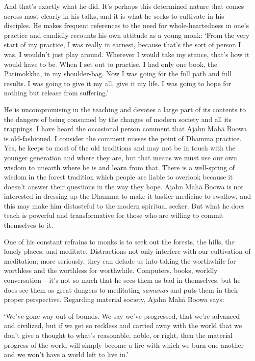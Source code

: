 And that's exactly what he did. It's perhaps this determined nature that
comes across most clearly in his talks, and it is what he seeks to
cultivate in his disciples. He makes frequent references to the need for
whole-heartedness in one's practice and candidly recounts his own
attitude as a young monk: `From the very start of my practice, I was
really in earnest, because that's the sort of person I was. I wouldn't
just play around. Wherever I would take my stance, that's how it would
have to be. When I set out to practise, I had only one book, the
Pātimokkha, in my shoulder-bag. Now I was going for the full path and
full results. I was going to give it my all, give it my life. I was
going to hope for nothing but release from suffering.'

He is uncompromising in the teaching and devotes a large part of its
contents to the dangers of being consumed by the changes of modern
society and all its trappings. I have heard the occasional person
comment that Ajahn Mahā Boowa is old-fashioned. I consider the comment
misses the point of Dhamma practice. Yes, he keeps to most of the old
traditions and may not be in touch with the younger generation and where
they are, but that means we must use our own wisdom to unearth where he
is and learn from that. There is a well-spring of wisdom in the forest
tradition which people are liable to overlook because it doesn't answer
their questions in the way they hope. Ajahn Mahā Boowa is not interested
in dressing up the Dhamma to make it tastier medicine to swallow, and
this may make him distasteful to the modern spiritual seeker. But what
he does teach is powerful and transformative for those who are willing
to commit themselves to it.

One of his constant refrains to monks is to seek out the forests, the
hills, the lonely places, and meditate. Distractions not only interfere
with our cultivation of meditation; more seriously, they can delude us
into taking the worthwhile for worthless and the worthless for
worthwhile. Computers, books, worldly conversation -- it's not so much
that he sees them as bad in themselves, but he does see them as great
dangers to meditating \emph{samanas} and puts them in their proper
perspective. Regarding material society, Ajahn Mahā Boowa says:

`We've gone way out of bounds. We say we've progressed, that we're
advanced and civilized, but if we get so reckless and carried away with
the world that we don't give a thought to what's reasonable, noble, or
right, then the material progress of the world will simply become a fire
with which we burn one another and we won't have a world left to live
in.'

